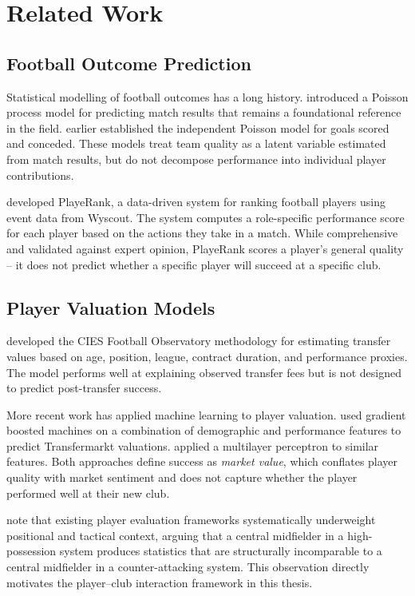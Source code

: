 \documentclass[12pt, a4paper, oneside]{report}
\begin{document}
\chapter{Related Work}
\label{chap:related}

\section{Football Outcome Prediction}

Statistical modelling of football outcomes has a long history. \citet{dixon1997} introduced a Poisson process model for predicting match results that remains a foundational reference in the field. \citet{maher1982} earlier established the independent Poisson model for goals scored and conceded. These models treat team quality as a latent variable estimated from match results, but do not decompose performance into individual player contributions.

\citet{pappalardo2019} developed PlayeRank, a data-driven system for ranking football players using event data from Wyscout. The system computes a role-specific performance score for each player based on the actions they take in a match. While comprehensive and validated against expert opinion, PlayeRank scores a player's general quality -- it does not predict whether a specific player will succeed at a specific club.

\section{Player Valuation Models}

\citet{poli2014} developed the CIES Football Observatory methodology for estimating transfer values based on age, position, league, contract duration, and performance proxies. The model performs well at explaining observed transfer fees but is not designed to predict post-transfer success.

More recent work has applied machine learning to player valuation. \citet{muller2017} used gradient boosted machines on a combination of demographic and performance features to predict Transfermarkt valuations. \citet{kern2021} applied a multilayer perceptron to similar features. Both approaches define success as \textit{market value}, which conflates player quality with market sentiment and does not capture whether the player performed well at their new club.

\citet{Memmert2018} note that existing player evaluation frameworks systematically underweight positional and tactical context, arguing that a central midfielder in a high-possession system produces statistics that are structurally incomparable to a central midfielder in a counter-attacking system. This observation directly motivates the player--club interaction framework in this thesis.
\end{document}
